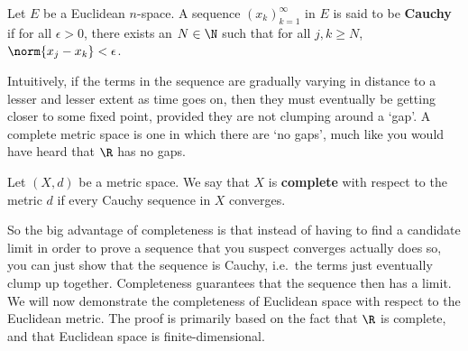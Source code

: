 \begin{definition}
  Let \( E \) be a Euclidean \( n \)-space. A sequence \( (x_k)_{k=1}^\infty \) in \( E \) is said to be \textbf{Cauchy} if for all \( \epsilon>0 \), there exists an \( N\in\N \) such that for all \( j,k\geq N \), \( \norm{x_j-x_k}<\epsilon \).
\end{definition}

Intuitively, if the terms in the sequence are gradually varying in distance to a lesser and lesser extent as time goes on, then they must eventually be getting closer to some fixed point, provided they are not clumping around a `gap'. A complete metric space is one in which there are `no gaps', much like you would have heard that \( \R \) has no gaps.

\begin{definition}
  Let \( (X,d) \) be a metric space. We say that \( X \) is \textbf{complete} with respect to the metric \( d \) if every Cauchy sequence in \( X \) converges.
\end{definition}

So the big advantage of completeness is that instead of having to find a candidate limit in order to prove a sequence that you suspect converges actually does so, you can just show that the sequence is Cauchy, i.e.\ the terms just eventually clump up together. Completeness guarantees that the sequence then has a limit. We will now demonstrate the completeness of Euclidean space with respect to the Euclidean metric. The proof is primarily based on the fact that \( \R \) is complete, and that Euclidean space is finite-dimensional.

